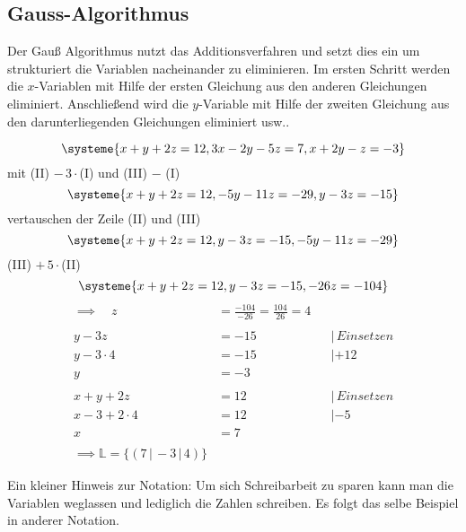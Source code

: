 \documentclass[a4paper,12pt]{article}
\newcommand{\Beispiel}[1]{
	\vspace*{0.2cm}
	\begin{tcolorbox}[breakable,colback=yellow!0,colframe=green!65!black,title=\textbf{Beispiel:},width=\linewidth ]
		{#1}
	\end{tcolorbox}
}
\begin{document}
	\subsection{Gauss-Algorithmus}
	Der Gauß Algorithmus nutzt das Additionsverfahren und setzt dies ein um strukturiert die Variablen nacheinander zu eliminieren. Im ersten Schritt werden die $x$-Variablen mit Hilfe der ersten Gleichung aus den anderen Gleichungen eliminiert. Anschließend wird die $y$-Variable mit Hilfe der zweiten Gleichung aus den darunterliegenden Gleichungen eliminiert usw..
	\Beispiel{
		\[\systeme{
			x+y+2z=12,
			3x-2y-5z=7,
			x+2y-z=-3
		}\]
		mit (II) $-\,3\cdot$(I) und (III) $-$ (I) 
		\[\systeme{
			x+y+2z=12,
			-5y-11z=-29,
			y-3z=-15
		}\]
		vertauschen der Zeile (II) und (III)
		\[\systeme{
			x+y+2z=12,
			y-3z=-15,
			-5y-11z=-29
		}\]
		(III) $+\, 5\cdot $(II)
		\[\systeme{
			x+y+2z=12,
			y-3z=-15,
			-26z=-104
		}\]
	\begin{align*}
		\implies \quad z&=\frac{-104}{-26}=\frac{104}{26}=4\\\\
		y-3z&=-15&&| \,Einsetzen\\
		y-3\cdot 4&=-15		&& | +12\\
		y&=-3\\\\
		x+y+2z&=12 &&|\, Einsetzen\\
		x-3+2\cdot 4&=12&&| -5\\
		x&=7\\\\
		\implies \mathds{L}=\{(7\,|\,-3\,|\,4)\}
	\end{align*}
	}
Ein kleiner Hinweis zur Notation: Um sich Schreibarbeit zu sparen kann man die Variablen weglassen und lediglich die Zahlen schreiben. Es folgt das selbe Beispiel in anderer Notation.
\end{document}

